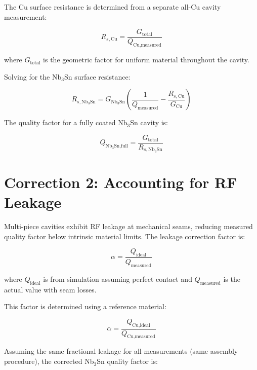 The Cu surface resistance is determined from a separate all-Cu cavity measurement:

\begin{equation}
R_{s,\text{Cu}} = \frac{G_\text{total}}{Q_\text{Cu,measured}}
\label{eq:Rs_Cu}
\end{equation}

\noindent where $G_\text{total}$ is the geometric factor for uniform material throughout the cavity.

Solving for the Nb$_3$Sn surface resistance:

\begin{equation}
R_{s,\text{Nb}_3\text{Sn}} = G_{\text{Nb}_3\text{Sn}} \left(\frac{1}{Q_\text{measured}} - \frac{R_{s,\text{Cu}}}{G_\text{Cu}}\right)
\label{eq:Rs_Nb3Sn}
\end{equation}

The quality factor for a fully coated Nb$_3$Sn cavity is:

\begin{equation}
Q_{\text{Nb}_3\text{Sn,full}} = \frac{G_\text{total}}{R_{s,\text{Nb}_3\text{Sn}}}
\label{eq:Q_full}
\end{equation}

\section{Correction 2: Accounting for RF Leakage}\label{sec:RFleakage}

Multi-piece cavities exhibit RF leakage at mechanical seams, reducing measured quality factor below intrinsic material limits. The leakage correction factor is:

\begin{equation}
\alpha = \frac{Q_\text{ideal}}{Q_\text{measured}}
\label{eq:alpha_def}
\end{equation}

where $Q_\text{ideal}$ is from simulation assuming perfect contact and $Q_\text{measured}$ is the actual value with seam losses.

\noindent This factor is determined using a reference material:

\begin{equation}
\alpha = \frac{Q_\text{Cu,ideal}}{Q_\text{Cu,measured}}
\label{eq:alpha_Cu}
\end{equation}

\noindent Assuming the same fractional leakage for all measurements (same assembly procedure), the corrected Nb$_3$Sn quality factor is:

